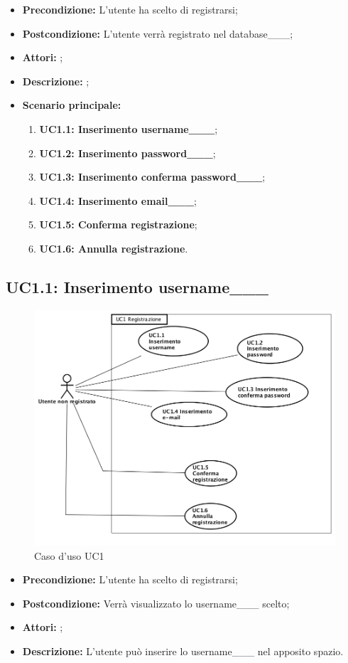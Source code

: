 \begin{itemize}
	\item \textbf{Precondizione:} L'utente ha scelto di registrarsi;
	\item \textbf{Postcondizione:} L'utente verrà registrato nel database___;
	\item \textbf{Attori:} ;
	\item \textbf{Descrizione:} ;
	\item \textbf{Scenario principale:}
	\begin{enumerate}
		\item \textbf{ UC1.1: Inserimento username___};
		\item \textbf{ UC1.2: Inserimento password___};
		\item \textbf{ UC1.3: Inserimento conferma password___};
		\item \textbf{ UC1.4: Inserimento email___};
		\item \textbf{ UC1.5: Conferma registrazione};
		\item \textbf{ UC1.6: Annulla registrazione}.
	\end{enumerate}
\end{itemize}
\subsection{ UC1.1: Inserimento username___}

\begin{figure}[h]
	\begin{center}
	\includegraphics[scale=0.4]{diagram/UC1.png}
	\caption{Caso d'uso UC1}
	\end{center}
\end{figure}
\begin{itemize}
	\item \textbf{Precondizione:} L'utente ha scelto di registrarsi;
	\item \textbf{Postcondizione:} Verrà visualizzato lo username___ scelto;
	\item \textbf{Attori:} ;
	\item \textbf{Descrizione:} L'utente può inserire lo username___ nel apposito spazio.
\end{itemize}
